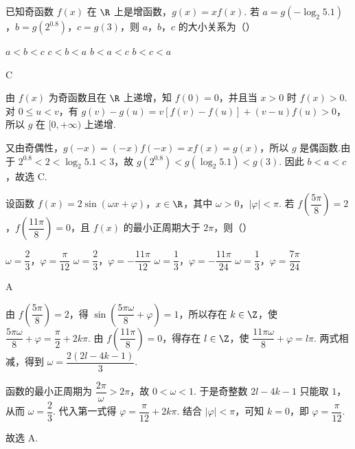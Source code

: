 \begin{problem}
已知奇函数 \(f(x)\) 在 \(\R\) 上是增函数，\(g(x)=xf(x)\). 若 \(a=g(-\log_2 5.1)\)，\(b=g(2^{0.8})\)，\(c=g(3)\)，则 \(a\)，\(b\)，\(c\) 的大小关系为（\quad）

\choices
    {\(a<b<c\)}
    {\(c<b<a\)}
    {\(b<a<c\)}
    {\(b<c<a\)}
\end{problem}

\begin{answer}
C
\end{answer}

\begin{solution}
由 \(f(x)\) 为奇函数且在 \(\R\) 上递增，知 \(f(0)=0\)，并且当 \(x>0\) 时 \(f(x)>0\). 对 \(0\leq u<v\)，有
\(g(v)-g(u)=v[f(v)-f(u)]+(v-u)f(u)>0\)，所以 \(g\) 在 \([0,+\infty)\) 上递增.

又由奇偶性，\(g(-x)=(-x)f(-x)=xf(x)=g(x)\)，所以 \(g\) 是偶函数.由于
\(2^{0.8}<2<\log_2 5.1<3\)，故
\(g(2^{0.8})<g(\log_2 5.1)<g(3)\). 因此
\(b<a<c\)，故选 C.
\end{solution}

\begin{problem}
设函数 \(f(x)=2\sin(\omega x+\varphi)\)，\(x\in\R\)，其中 \(\omega>0\)，\(|\varphi|<\pi\). 若 \(f\left(\dfrac{5\pi}{8}\right)=2\)，\(f\left(\dfrac{11\pi}{8}\right)=0\)，且 \(f(x)\) 的最小正周期大于 \(2\pi\)，则（\quad）

\choices
    {\(\omega=\dfrac{2}{3}\)，\(\varphi=\dfrac{\pi}{12}\)}
    {\(\omega=\dfrac{2}{3}\)，\(\varphi=-\dfrac{11\pi}{12}\)}
    {\(\omega=\dfrac{1}{3}\)，\(\varphi=-\dfrac{11\pi}{24}\)}
    {\(\omega=\dfrac{1}{3}\)，\(\varphi=\dfrac{7\pi}{24}\)}
\end{problem}

\begin{answer}
A
\end{answer}

\begin{solution}
由 \(f\left(\dfrac{5\pi}{8}\right)=2\)，得
\(\sin\left(\dfrac{5\pi\omega}{8}+\varphi\right)=1\)，所以存在 \(k\in\Z\)，使
\(\dfrac{5\pi\omega}{8}+\varphi=\dfrac\pi2+2k\pi\). 由
\(f\left(\dfrac{11\pi}{8}\right)=0\)，得存在 \(l\in\Z\)，使
\(\dfrac{11\pi\omega}{8}+\varphi=l\pi\). 两式相减，得到
\(\omega=\dfrac{2(2l-4k-1)}{3}\).

函数的最小正周期为 \(\dfrac{2\pi}{\omega}>2\pi\)，故 \(0<\omega<1\). 于是奇整数 \(2l-4k-1\) 只能取 \(1\)，从而 \(\omega=\dfrac23\). 代入第一式得
\(\varphi=\dfrac\pi{12}+2k\pi\). 结合 \(|\varphi|<\pi\)，可知 \(k=0\)，即 \(\varphi=\dfrac\pi{12}\).

故选 A.
\end{solution}

